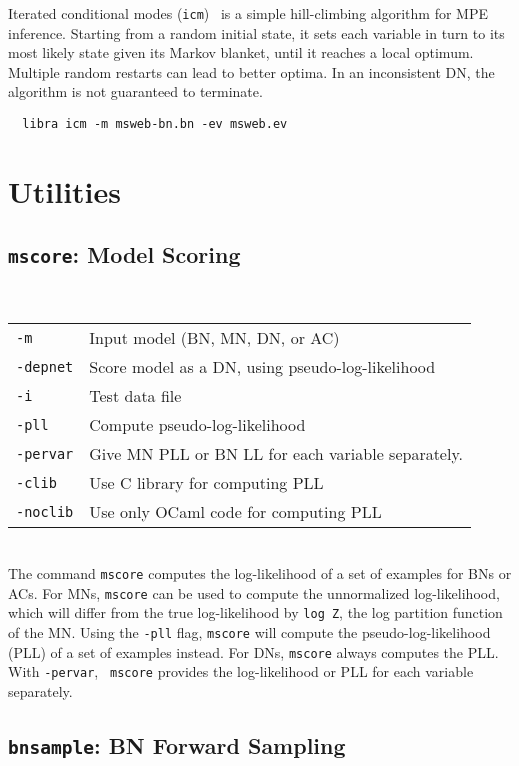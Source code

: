 \documentclass[11pt]{article}
\begin{document}
Iterated conditional modes ({\tt icm})~\cite{besag86} is a simple
hill-climbing algorithm for MPE inference.  Starting from a random
initial state, it sets each variable in turn to its most likely state
given its Markov blanket, until it reaches a local optimum.  Multiple
random restarts can lead to better optima.  In an inconsistent DN, the
algorithm is not guaranteed to terminate.
\begin{verbatim}
  libra icm -m msweb-bn.bn -ev msweb.ev
\end{verbatim}


\section{Utilities}

\subsection{{\tt mscore}: Model Scoring} \label{sec:mscore}

\noindent {} \\
\begin{tabular}{ll}
{\tt -m} &       Input model (BN, MN, DN, or AC) \\
{\tt -depnet} &  Score model as a DN, using pseudo-log-likelihood \\
{\tt -i} &       Test data file \\
{\tt -pll} &     Compute pseudo-log-likelihood \\
{\tt -pervar} &  Give MN PLL or BN LL for each variable separately. \\
{\tt -clib} &    Use C library for computing PLL \\
{\tt -noclib} &  Use only OCaml code for computing PLL \\
\end{tabular} \\

The command {\tt mscore} computes the log-likelihood of a set of
examples for BNs or ACs.  For MNs, {\tt mscore} can be used to compute
the unnormalized log-likelihood, which will differ from the true
log-likelihood by {\tt log Z}, the log partition function of the MN.
Using the {\tt -pll} flag, {\tt mscore} will compute the
pseudo-log-likelihood (PLL) of a set of examples instead.  For DNs,
{\tt mscore} always computes the PLL.  With {\tt -pervar}, {\tt
mscore} provides the log-likelihood or PLL for each variable
separately.

\subsection{{\tt bnsample}: BN Forward Sampling} \label{sec:bnsample}
\end{document}
